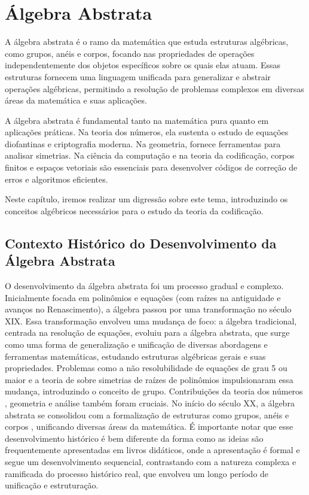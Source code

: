 \chapter{Álgebra Abstrata}

A álgebra abstrata é o ramo da matemática que estuda estruturas algébricas,
como grupos, anéis e corpos, focando nas propriedades de operações
independentemente dos objetos específicos sobre os quais elas atuam. Essas
estruturas fornecem uma linguagem unificada para generalizar e abstrair
operações algébricas, permitindo a resolução de problemas complexos em diversas
áreas da matemática e suas aplicações.

A álgebra abstrata é fundamental tanto na matemática pura quanto em aplicações
práticas. Na teoria dos números, ela sustenta o estudo de equações diofantinas
e criptografia moderna. Na geometria, fornece ferramentas para analisar
simetrias. Na ciência da computação e na teoria da codificação, corpos finitos
e espaços vetoriais são essenciais para desenvolver códigos de correção de
erros e algoritmos eficientes.

Neste capítulo, iremos realizar um digressão sobre este tema, introduzindo os
conceitos algébricos necessários para o estudo da teoria da codificação.


\section{Contexto Histórico do Desenvolvimento da Álgebra Abstrata}

O desenvolvimento da álgebra abstrata foi um processo gradual e complexo.
Inicialmente focada em polinômios e equações (com raízes na antiguidade e
avanços no Renascimento), a álgebra passou por uma transformação no século XIX.
Essa transformação envolveu uma mudança de foco: a álgebra tradicional,
centrada na resolução de equações, evoluiu para a álgebra abstrata, que surge
como uma forma de generalização e unificação de diversas abordagens e
ferramentas matemáticas, estudando estruturas algébricas gerais e suas
propriedades. Problemas como a não resolubilidade de equações de grau 5 ou
maior \parencite{abel1826memoire} e a teoria de \textcite{galois1832memoire} sobre simetrias de raízes de polinômios
impulsionaram essa mudança, introduzindo o conceito de grupo. Contribuições da
teoria dos números \parencite{gauss1801disquisitiones}, geometria \parencite{klein1926vorlesungen} e análise também foram cruciais.
No início do século XX, a álgebra abstrata se consolidou com a formalização de
estruturas como grupos, anéis e corpos \parencite{noether1921idealtheorie,van1930moderne,artin1991algebra},
unificando diversas áreas da matemática. É importante notar que esse
desenvolvimento histórico é bem diferente da forma como as ideias são
frequentemente apresentadas em livros didáticos, onde a apresentação é formal e
segue um desenvolvimento sequencial, contrastando com a natureza complexa e
ramificada do processo histórico real, que envolveu um longo período de
unificação e estruturação.


